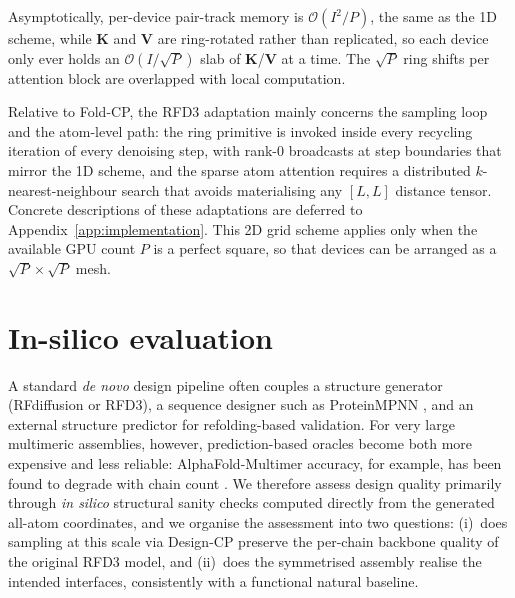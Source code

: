 Asymptotically, per-device pair-track memory is $\mathcal{O}(I^{2}/P)$, the same
as the 1D scheme, while $\mathbf{K}$ and $\mathbf{V}$ are ring-rotated rather than
replicated, so each device only ever holds an $\mathcal{O}(I/\sqrt{P})$ slab of
$\mathbf{K}$/$\mathbf{V}$ at a time. The $\sqrt{P}$ ring shifts per attention block
are overlapped with local computation.

Relative to Fold-CP, the RFD3 adaptation mainly concerns the sampling loop and the
atom-level path: the ring primitive is invoked inside every recycling iteration of
every denoising step, with rank-$0$ broadcasts at step boundaries that mirror the
1D scheme, and the sparse atom attention requires a distributed $k$-nearest-neighbour
search that avoids materialising any $[L,L]$ distance tensor. Concrete descriptions
of these adaptations are deferred to Appendix~\ref{app:implementation}. This 2D
grid scheme applies only when the available GPU count $P$ is a perfect square, so
that devices can be arranged as a $\sqrt{P}\times\sqrt{P}$ mesh.

\section{In-silico evaluation}
\label{sec:evaluation}

A standard \emph{de novo} design pipeline often couples a structure generator
(RFdiffusion or RFD3), a sequence designer such as ProteinMPNN
\parencite{dauparasRobustDeepLearning2022}, and an external structure predictor
for refolding-based validation. For very large multimeric assemblies, however,
prediction-based oracles become both more expensive and less reliable:
AlphaFold-Multimer accuracy, for example, has been found to degrade with chain
count \parencite{bryant_predicting_2022}. We therefore assess design quality
primarily through \emph{in silico} structural sanity checks computed directly from
the generated all-atom coordinates, and we organise the assessment into two
questions: (i)~does sampling at this scale via Design-CP preserve the per-chain
backbone quality of the original RFD3 model, and (ii)~does the symmetrised
assembly realise the intended interfaces, consistently with a functional natural
baseline.


